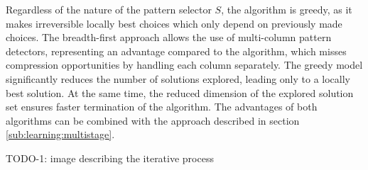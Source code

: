 Regardless of the nature of the pattern selector \(S\), the algorithm is greedy, as it makes irreversible locally best choices which only depend on previously made choices. The breadth-first approach allows the use of multi-column pattern detectors, representing an advantage compared to the  algorithm, which misses compression opportunities by handling each column separately. The greedy model significantly reduces the number of solutions explored, leading only to a locally best solution. At the same time, the reduced dimension of the explored solution set ensures faster termination of the algorithm. The advantages of both algorithms can be combined with the  approach described in section \ref{sub:learning:multistage}.

TODO-1: image describing the iterative process

